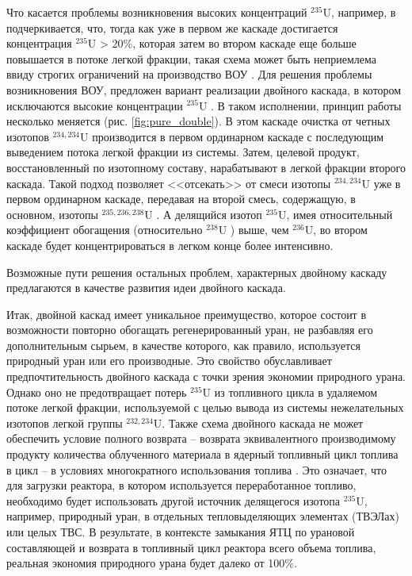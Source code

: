 Что касается проблемы возникновения высоких концентраций $^{235}$U, например, в \cite{palkinPurificationReprocessedUranium2016} подчеркивается, что, тогда как уже в первом же каскаде достигается концентрация $^{235}$U > 20\%, которая затем во втором каскаде еще больше повышается в потоке легкой фракции, такая схема может быть неприемлема ввиду строгих ограничений на производство ВОУ \cite{ManagementHighEnriched2005}. Для решения проблемы возникновения ВОУ, предложен вариант реализации двойного каскада, в котором исключаются высокие концентрации $^{235}$U \cite{zhurinSposobIzotopnogoVosstanovleniya2010}. В таком исполнении, принцип работы несколько меняется (рис. \ref{fig:pure_double}). В этом каскаде очистка от четных изотопов $^{234,234}$U производится в первом ординарном каскаде с последующим выведением потока легкой фракции из системы. Затем, целевой продукт, восстановленный по изотопному составу, нарабатывают в легкой фракции второго каскада. Такой подход позволяет <<отсекать>> от смеси изотопы $^{234,234}$U уже в первом ординарном каскаде, передавая на второй смесь, содержащую, в основном, изотопы $^{235,236,238}$U \cite{borodynyaIssledovanieProblemyVovlecheniya1989}. А делящийся изотоп $^{235}$U, имея относительный коэффициент обогащения (относительно $^{238}$U ) выше, чем $^{236}$U, во втором каскаде будет концентрироваться в легком конце более интенсивно.

Возможные пути решения остальных проблем, характерных двойному каскаду предлагаются в качестве развития идеи двойного каскада.



Итак, двойной каскад имеет уникальное преимущество, которое состоит в возможности повторно обогащать регенерированный уран, не разбавляя его дополнительным сырьем, в качестве которого, как правило, используется природный уран или его производные. Это свойство обуславливает предпочтительность двойного каскада с точки зрения экономии природного урана. Однако оно не предотвращает потерь $^{235}$U из топливного цикла в удаляемом потоке легкой фракции, используемой с целью вывода из системы нежелательных изотопов легкой группы $^{232,234}$U. Также схема двойного каскада не может обеспечить условие полного возврата -- возврата эквивалентного производимому продукту количества облученного материала в ядерный топливный цикл топлива в цикл -- в условиях многократного использования топлива \cite{smirnovObogashchenieRegenerirovannogoUrana2018}. Это означает, что для загрузки реактора, в котором используется переработанное топливо, необходимо будет использовать другой источник делящегося изотопа $^{235}$U, например, природный уран, в отдельных тепловыделяющих элементах (ТВЭЛах) или целых ТВС. В результате, в контексте замыкания ЯТЦ по урановой составляющей и возврата в топливный цикл реактора всего объема топлива, реальная экономия природного урана будет далеко от 100\%.

